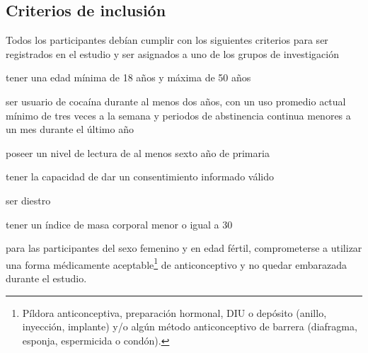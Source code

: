 \subsection{Criterios de inclusión}
Todos los participantes debían cumplir con los siguientes criterios para ser registrados en el estudio y ser asignados a uno de los grupos de investigación
\begin{enumerate*}[label=\emph{\alph*}), before=\unskip{: }, itemjoin={{; }}, itemjoin*={{, y }}]
    \item tener una edad mínima de 18 años y máxima de 50 años
    \item ser usuario de cocaína durante al menos dos  años, con un uso promedio actual mínimo de tres veces a la semana y periodos de abstinencia continua menores a un mes durante el último año
    \item poseer un nivel de lectura de al menos sexto año de primaria
    \item tener la capacidad de dar un consentimiento informado válido
    \item ser diestro
    \item tener un índice de masa corporal menor o igual a 30
    \item para las participantes del sexo femenino y en edad fértil, comprometerse a utilizar una forma médicamente aceptable\footnote{Píldora anticonceptiva, preparación hormonal, DIU o depósito (anillo, inyección, implante) y/o algún método anticonceptivo de barrera (diafragma, esponja, espermicida o condón).} de anticonceptivo y no quedar embarazada durante el estudio.
\end{enumerate*}

